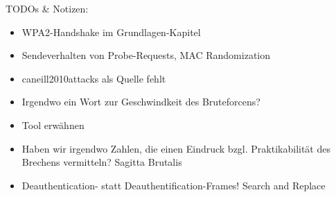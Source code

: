 TODOs \& Notizen:
\begin{itemize}
	\item WPA2-Handshake im Grundlagen-Kapitel
	\item Sendeverhalten von Probe-Requests, MAC Randomization
	\item caneill2010attacks als Quelle fehlt
	\item Irgendwo ein Wort zur Geschwindkeit des Bruteforcens?
	\item Tool erwähnen
	\item Haben wir irgendwo Zahlen, die einen Eindruck bzgl. Praktikabilität des Brechens vermitteln? Sagitta Brutalis
	\item Deauthentication- statt Deauthentification-Frames! Search and Replace
\end{itemize}